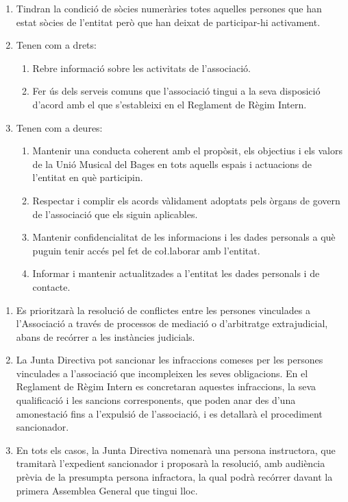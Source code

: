 \documentclass[11pt,a4paper]{article}
\newcommand{\UMB}{Unió Musical del Bages\xspace}
\newcommand{\JD}{Junta Directiva\xspace}
\newcommand{\AG}{Assemblea General\xspace}
\DeclareRobustCommand{\RRI}{Reglament de Règim Intern\xspace}
\begin{document}

\begin{enumerate}
    \item Tindran la condició de sòcies numeràries totes aquelles persones que han estat sòcies de l'entitat però que han deixat de participar-hi activament.

    \item Tenen com a drets:
    \begin{enumerate}
        \item Rebre informació sobre les activitats de l'associació.
        \item Fer ús dels serveis comuns que l'associació tingui a la seva disposició d'acord amb el que s'estableixi en el \RRI.
    \end{enumerate}

    \item Tenen com a deures:
    \begin{enumerate}
        \item Mantenir una conducta coherent amb el propòsit, els objectius i els valors de la \UMB en tots aquells espais i actuacions de l'entitat en què participin.
        \item Respectar i complir els acords vàlidament adoptats pels òrgans de govern de l'associació que els siguin aplicables.
        \item Mantenir confidencialitat de les informacions i les dades personals a què puguin tenir accés pel fet de co\l.laborar amb l'entitat.
        \item Informar i mantenir actualitzades a l'entitat les dades personals i de contacte.
    \end{enumerate}
\end{enumerate}


\begin{enumerate}
    \item Es prioritzarà la resolució de conflictes entre les persones vinculades a l'Associació a través de processos de mediació o d'arbitratge extrajudicial, abans de recórrer a les instàncies judicials.
    \item La \JD pot sancionar les infraccions comeses per les persones vinculades a l'associació que incompleixen les seves obligacions. En el \RRI es concretaran aquestes infraccions, la seva qualificació i les sancions corresponents, que poden anar des d'una amonestació fins a l'expulsió de l'associació, i es detallarà el procediment sancionador.
    \item En tots els casos, la \JD nomenarà una persona instructora, que tramitarà l'expedient sancionador i proposarà la resolució, amb audiència prèvia de la presumpta persona infractora, la qual podrà recórrer davant la primera \AG que tingui lloc.
\end{enumerate}
\end{document}

